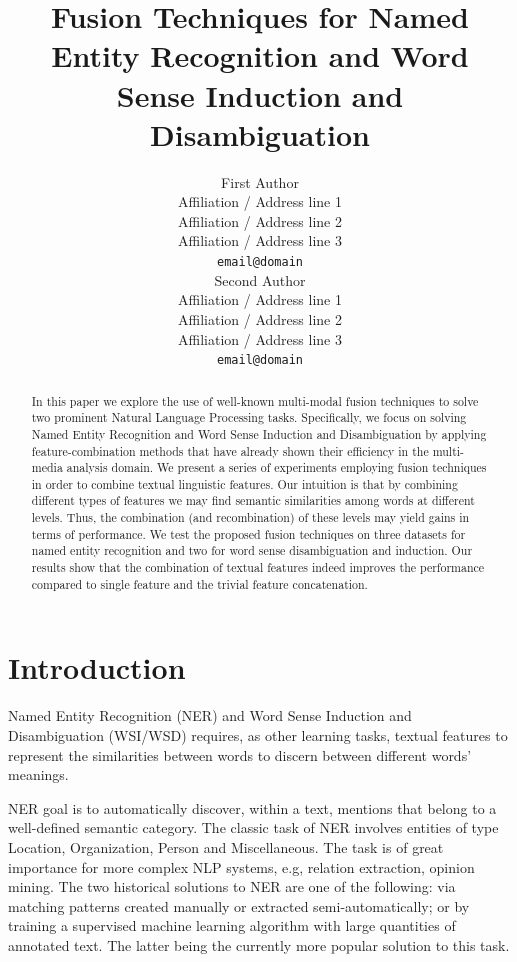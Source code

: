 \documentclass[11pt]{article}
\title{Fusion Techniques for Named Entity Recognition and Word Sense Induction and Disambiguation}
\author{First Author\\
  Affiliation / Address line 1 \\
  Affiliation / Address line 2 \\
  Affiliation / Address line 3 \\
  {\tt email@domain} \\\And
  Second Author \\
  Affiliation / Address line 1 \\
  Affiliation / Address line 2 \\
  Affiliation / Address line 3 \\
  {\tt email@domain} \\}
\date{}
\begin{document}
\maketitle
\begin{abstract}
In this paper we explore the use of well-known multi-modal fusion techniques to solve two prominent Natural Language Processing tasks. Specifically, we focus on solving Named Entity Recognition and Word Sense Induction and Disambiguation by applying feature-combination methods that have already shown their efficiency in the multi-media analysis domain. We present a series of experiments employing fusion techniques in order to combine textual linguistic features. Our intuition is that by combining different types of features we may find semantic similarities among words at different levels. Thus, the combination (and recombination) of these levels may yield gains in terms of performance.
We test the proposed fusion techniques on three datasets for named entity recognition and two for word sense disambiguation and induction. Our results show that the combination of textual features indeed improves the performance compared to single feature and the trivial feature concatenation.
\end{abstract}


\section{Introduction}

Named Entity Recognition (NER) and Word Sense Induction and Disambiguation (WSI/WSD) requires, as other learning tasks, textual features to represent the similarities between words to discern between different words' meanings. 

NER goal is to automatically discover, within a text, mentions that belong to a well-defined semantic category. The classic task of NER involves entities of type Location, Organization, Person and Miscellaneous. The task is of great importance for more complex NLP systems, e.g, relation extraction, opinion mining. The two historical solutions to NER are one of the following: via matching patterns created manually or extracted semi-automatically; or by training a supervised machine learning algorithm with large quantities of annotated text. The latter being the currently more popular solution to this task.
\end{document}
